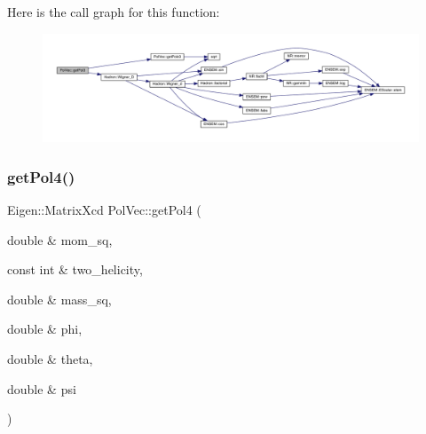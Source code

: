 Here is the call graph for this function\+:
\nopagebreak
\begin{figure}[H]
\begin{center}
\leavevmode
\includegraphics[width=350pt]{d7/d0c/namespacePolVec_ade3c809bd4af71b85d16a9363ac33ee6_cgraph}
\end{center}
\end{figure}
\mbox{\label{namespacePolVec_a893f95fc9856b40243deeba6939e5318}} 
\subsubsection{\texorpdfstring{getPol4()}{getPol4()}}
{\footnotesize\ttfamily Eigen\+::\+Matrix\+Xcd Pol\+Vec\+::get\+Pol4 (\begin{DoxyParamCaption}\item[{double \&}]{mom\+\_\+sq,  }\item[{const int \&}]{two\+\_\+helicity,  }\item[{double \&}]{mass\+\_\+sq,  }\item[{double \&}]{phi,  }\item[{double \&}]{theta,  }\item[{double \&}]{psi }\end{DoxyParamCaption})}

